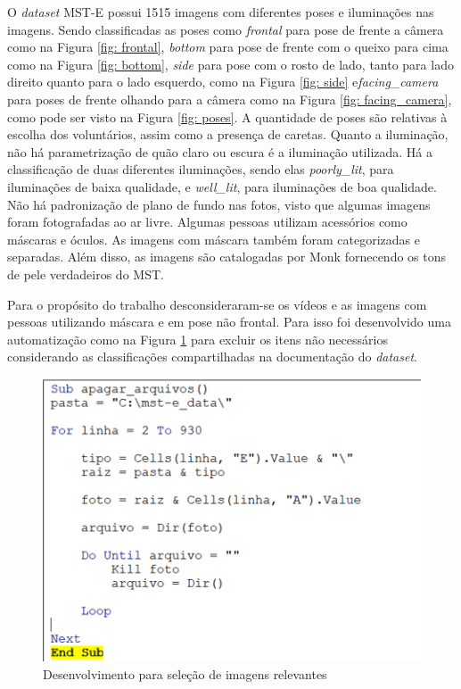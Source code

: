 O \textit{dataset} MST-E possui 1515 imagens com diferentes poses e iluminações nas imagens. Sendo classificadas as poses como \textit{frontal} para pose de frente a câmera como na Figura \ref{fig: frontal}, \textit{bottom} para pose de frente com o queixo para cima como na Figura \ref{fig: bottom}, \textit{side} para pose com o rosto de lado, tanto para lado direito quanto para o lado esquerdo, como na Figura \ref{fig: side} e\textit{facing\_camera} para poses de frente olhando para a câmera como na Figura \ref{fig: facing_camera}, como pode ser visto na Figura \ref{fig: poses}. A quantidade de poses são relativas à escolha dos voluntários, assim como a presença de caretas. Quanto a iluminação, não há parametrização de quão claro ou escura é a iluminação utilizada. Há a classificação de duas diferentes iluminações, sendo elas \textit{poorly\_lit}, para iluminações de baixa qualidade,  e \textit{well\_lit}, para iluminações de boa qualidade. Não há padronização de plano de fundo nas fotos, visto que algumas imagens foram fotografadas ao ar livre. Algumas pessoas utilizam acessórios como máscaras e óculos. As imagens com máscara também foram categorizadas e separadas. Além disso, as imagens são catalogadas por Monk fornecendo os tons de pele verdadeiros do MST.


Para o propósito do trabalho desconsideraram-se os vídeos e as imagens com pessoas utilizando máscara e em pose não frontal. Para isso foi desenvolvido uma automatização como na Figura \ref{fig:x Visual_basic} para excluir os itens não necessários considerando as classificações compartilhadas na documentação do \textit{dataset}. 

\begin{figure}[h!]
\centering
\caption{Desenvolvimento para seleção de imagens relevantes}
\includegraphics[scale=0.9]{Template_Latex_TCC-UNIFTEC/_lib/imagens/VisualBasic.png}

\label{fig:x Visual_basic}
\end{figure}

